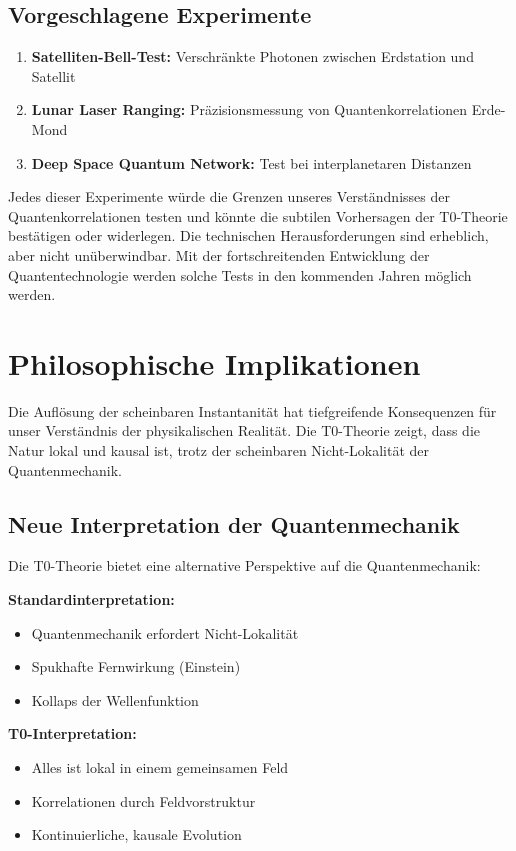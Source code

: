 	\subsection{Vorgeschlagene Experimente}
	
	\begin{enumerate}
		\item \textbf{Satelliten-Bell-Test:} Verschränkte Photonen zwischen Erdstation und Satellit
		\item \textbf{Lunar Laser Ranging:} Präzisionsmessung von Quantenkorrelationen Erde-Mond
		\item \textbf{Deep Space Quantum Network:} Test bei interplanetaren Distanzen
	\end{enumerate}
	
	Jedes dieser Experimente würde die Grenzen unseres Verständnisses der Quantenkorrelationen testen und könnte die subtilen Vorhersagen der T0-Theorie bestätigen oder widerlegen. Die technischen Herausforderungen sind erheblich, aber nicht unüberwindbar. Mit der fortschreitenden Entwicklung der Quantentechnologie werden solche Tests in den kommenden Jahren möglich werden.
	
	\section{Philosophische Implikationen}
	
	Die Auflösung der scheinbaren Instantanität hat tiefgreifende Konsequenzen für unser Verständnis der physikalischen Realität. Die T0-Theorie zeigt, dass die Natur lokal und kausal ist, trotz der scheinbaren Nicht-Lokalität der Quantenmechanik.
	
	\subsection{Neue Interpretation der Quantenmechanik}
	
	Die T0-Theorie bietet eine alternative Perspektive auf die Quantenmechanik:
	
	\begin{tcolorbox}[colback=t0red!5!white, colframe=t0red!75!black, title=Neue Perspektive]
		\textbf{Standardinterpretation:}
		\begin{itemize}
			\item Quantenmechanik erfordert Nicht-Lokalität
			\item Spukhafte Fernwirkung (Einstein)
			\item Kollaps der Wellenfunktion
		\end{itemize}
		
		\textbf{T0-Interpretation:}
		\begin{itemize}
			\item Alles ist lokal in einem gemeinsamen Feld
			\item Korrelationen durch Feldvorstruktur
			\item Kontinuierliche, kausale Evolution
		\end{itemize}
	\end{tcolorbox}
	
